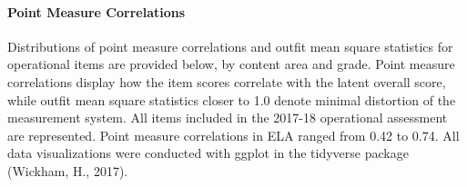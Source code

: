 \documentclass[]{article}
\let\oldparagraph\paragraph
\renewcommand{\paragraph}[1]{\oldparagraph{#1}\mbox{}}
\begin{document}
\paragraph{Point Measure Correlations}\label{point-measure-correlations}

Distributions of point measure correlations and outfit mean square
statistics for operational items are provided below, by content area and
grade. Point measure correlations display how the item scores correlate
with the latent overall score, while outfit mean square statistics
closer to 1.0 denote minimal distortion of the measurement system. All
items included in the 2017-18 operational assessment are represented.
Point measure correlations in ELA ranged from 0.42 to 0.74. All data
visualizations were conducted with ggplot in the tidyverse package
(Wickham, H., 2017).
\end{document}
